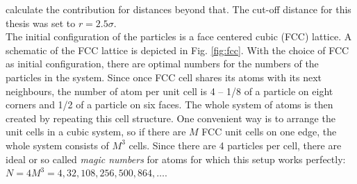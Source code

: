 \documentclass[12pt]{article}
\begin{document}
calculate the contribution for distances beyond that. The cut-off distance for this thesis was set to $r = 2.5\sigma$.\\
The initial configuration of the particles is a face centered cubic (FCC) lattice. A schematic of the FCC lattice is depicted in Fig. \ref{fig:fcc}.
With the choice of FCC as initial configuration, there are optimal numbers for the numbers of the particles in the system. Since once FCC cell 
shares its atoms with its next neighbours, the number of atom per unit cell is 4 -- 1/8 of a particle on eight corners and 1/2 of a particle on six faces.
The whole system of atoms is then created by repeating this cell structure. One convenient way is to arrange the unit cells in a cubic system, 
so if there are $M$ FCC unit cells on one edge, the whole system consists of $M^3$ cells. Since there are 4 particles per cell, 
there are ideal or so called \textit{magic numbers} for atoms for which this setup works perfectly: $N = 4M^3 = 4,32,108,256,500,864,\ldots$.\\
\end{document}
